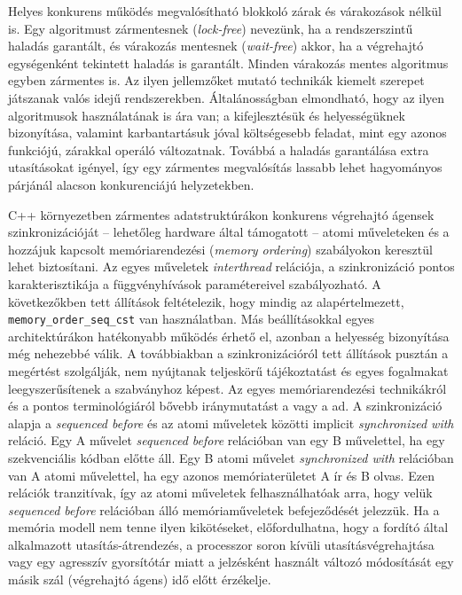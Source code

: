    Helyes konkurens működés megvalósítható blokkoló zárak és várakozások nélkül is. Egy algoritmust zármentesnek (\emph{lock-free}) nevezünk, ha a rendszerszintű haladás garantált, és várakozás mentesnek (\emph{wait-free}) akkor, ha a végrehajtó egységenként tekintett haladás is garantált. Minden várakozás mentes algoritmus egyben zármentes is. Az ilyen jellemzőket mutató technikák kiemelt szerepet játszanak valós idejű rendszerekben. Általánosságban elmondható, hogy az ilyen algoritmusok használatának is ára van; a kifejlesztésük és helyességüknek bizonyítása, valamint karbantartásuk jóval költségesebb feladat, mint egy azonos funkciójú, zárakkal operáló változatnak. Továbbá a haladás garantálása extra utasításokat igényel, így egy zármentes megvalósítás lassabb lehet hagyományos párjánál alacson konkurenciájú helyzetekben.
    
    C++ környezetben zármentes adatstruktúrákon konkurens végrehajtó ágensek szinkronizációját -- lehetőleg hardware által támogatott -- atomi műveleteken és a hozzájuk kapcsolt memóriarendezési (\emph{memory ordering}) szabályokon keresztül lehet biztosítani. Az egyes műveletek \emph{interthread} relációja, a szinkronizáció pontos karakterisztikája a függvényhívások paramétereivel szabályozható. A következőkben tett állítások feltételezik, hogy mindig az alapértelmezett, \texttt{memory\_order\_seq\_cst} van használatban. Más beállításokkal egyes architektúrákon hatékonyabb működés érhető el, azonban a helyesség bizonyítása még nehezebbé válik. A továbbiakban a szinkronizációról tett állítások pusztán a megértést szolgálják, nem nyújtanak teljeskörű tájékoztatást és egyes fogalmakat leegyszerűsítenek a szabványhoz képest. Az egyes memóriarendezési technikákról és a pontos terminológiáról bővebb iránymutatást a \cite{ConcurrencyInAction} vagy a \cite{C++11/MemoryModel} ad. A szinkronizáció alapja a \emph{sequenced before} és az atomi műveletek közötti implicit \emph{synchronized with} reláció. Egy A művelet \emph{sequenced before} relációban van egy B művelettel, ha egy szekvenciális kódban előtte áll. Egy B atomi művelet \emph{synchronized with} relációban van A atomi művelettel, ha egy azonos memóriaterületet A ír és B olvas. Ezen relációk tranzitívak, így az atomi műveletek felhasználhatóak arra, hogy velük \emph{sequenced before} relációban álló memóriaműveletek befejeződését jelezzük. Ha a memória modell nem tenne ilyen kikötéseket, előfordulhatna, hogy a fordító által alkalmazott utasítás-átrendezés, a processzor soron kívüli utasításvégrehajtása vagy egy agresszív gyorsítótár miatt a jelzésként használt változó módosítását egy másik szál (végrehajtó ágens) idő előtt érzékelje.
    
